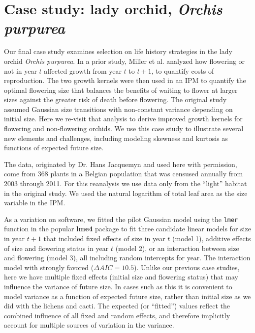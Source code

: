 \documentclass[12pt]{article}
\begin{document}
 
\section{Case study: lady orchid, \emph{Orchis purpurea}}
\label{sec:orchidCaseStudy} 
Our final case study examines selection on life history strategies in the lady orchid \textit{Orchis purpurea}. 
In a prior study, Miller et al. \citeyear{miller2012evolutionary} analyzed how flowering or not in year $t$ affected growth from year $t$ to $t+1$, to quantify costs of reproduction. 
The two growth kernels were then used in an IPM to quantify the optimal flowering size that balances the benefits of waiting to flower at larger sizes against the greater risk of death before flowering. 
The original study assumed Gaussian size transitions with non-constant variance depending on initial size. 
Here we re-visit that analysis to derive improved growth kernels for flowering and non-flowering orchids. 
We use this case study to illustrate several new elements and challenges, including modeling skewness and kurtosis as functions of expected future size.

The data, originated by Dr. Hans Jacquemyn and used here with permission, come from 368 plants in a Belgian population that was censused annually from 2003 through 2011. For this reanalysis we use data only from the ``light'' habitat in the original study. 
We used the natural logarithm of total leaf area as the size variable in the IPM. 

As a variation on software, we fitted the pilot Gaussian model using the \texttt{lmer} function in the popular \textbf{lme4} package to fit three candidate linear models for size in year $t+1$  that included fixed effects of size in year $t$ (model 1), additive effects of size and flowering status in year $t$ (model 2), or an interaction between size and flowering (model 3), all including random intercepts for year. 
The interaction model with strongly favored ($\Delta AIC = 10.5$). 
Unlike our previous case studies, here we have multiple fixed effects (initial size and flowering status) that may influence the variance of future size. 
In cases such as this it is convenient to model variance as a function of expected future size, rather than initial size as we did with the lichens and cacti. 
The expected (or ``fitted'') values reflect the combined influence of all fixed and random effects, and therefore implicitly account for multiple sources of variation in the variance. 
\end{document}
